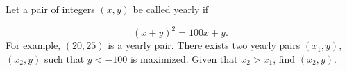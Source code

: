 Let a pair of integers $(x,y)$ be called yearly if

$$(x+y)^2=100x+y.$$For example, $(20,25)$ is a yearly pair. There exists two yearly pairs $(x_1,y)$, $(x_2,y)$ such that $y<-100$ is maximized. Given that $x_2>x_1$, find $(x_2,y)$.
